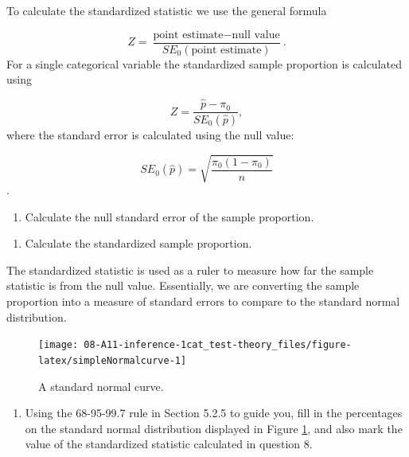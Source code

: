 \documentclass[
]{report}
\providecommand{\tightlist}{%
  \setlength{\itemsep}{0pt}\setlength{\parskip}{0pt}}
\begin{document}
\vspace{1in}

To calculate the standardized statistic we use the general formula

\[
Z = \frac{\text{point estimate} - \text{null value}}{SE_0(\text{point estimate})}.
\]
For a single categorical variable the standardized sample proportion is calculated using

\[
Z = \frac{\hat{p} - \pi_0}{SE_0(\hat{p})},
\]
where the standard error is calculated using the null value:

\[SE_0(\hat{p})=\sqrt{\frac{\pi_0(1-\pi_0)}{n}}\].
\vspace{0.5mm}

\newpage

\begin{enumerate}
\def\labelenumi{\arabic{enumi}.}
\setcounter{enumi}{6}
\tightlist
\item
  Calculate the null standard error of the sample proportion.
\end{enumerate}

\vspace{1in}

\begin{enumerate}
\def\labelenumi{\arabic{enumi}.}
\setcounter{enumi}{7}
\tightlist
\item
  Calculate the standardized sample proportion.
\end{enumerate}

\vspace{1in}

The standardized statistic is used as a ruler to measure how far the sample statistic is from the null value. Essentially, we are converting the sample proportion into a measure of standard errors to compare to the standard normal distribution.

\begin{figure}

{\centering \texttt{[image: 08-A11-inference-1cat\_test-theory\_files/figure-latex/simpleNormalcurve-1]} 

}

\caption{A standard normal curve.}\label{fig:simpleNormalcurve}
\end{figure}

\begin{enumerate}
\def\labelenumi{\arabic{enumi}.}
\setcounter{enumi}{8}
\tightlist
\item
  Using the 68-95-99.7 rule in Section 5.2.5 to guide you, fill in the percentages on the standard normal distribution displayed in Figure \ref{fig:simpleNormalcurve}, and also mark the value of the standardized statistic calculated in question 8.
\end{enumerate}
\end{document}
